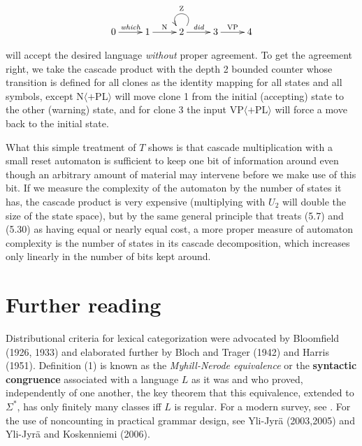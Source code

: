 \begin{equation}
\xymatrix{0\ar[r]^{\textit{which}} & 1\ar[r]^{\text{N}} &
2\ar[r]^{\textit{did}}\ar@(ur,ul)_{\text{Z}} & 3\ar[r]^{\text{VP}}& 4}
\end{equation}

\noindent
will accept the desired language {\it without} proper agreement. To get the
agreement right, we take the cascade product with the depth 2 bounded counter
whose transition is defined for all clones as the identity mapping for all
states and all symbols, except N$\langle +$PL$\rangle$ will move clone 1
from the initial (accepting) state to the other (warning) state, and for clone 
3 the input VP$\langle +$PL$\rangle$ will force a move back to the 
initial state. 

What this simple treatment of $T$ shows is that cascade multiplication with a
small reset automaton is sufficient to keep one bit of information around even
though an arbitrary amount of material may intervene before we make use of
this bit.  If we measure the complexity of the automaton by the number of
states it has, the cascade product is very expensive (multiplying with $U_2$
will double the size of the state space), but by the same general principle
that treats (5.7) and (5.30) as having equal or nearly equal cost, a more
proper measure of automaton complexity is the number of states in its cascade
decomposition, which increases only linearly in the number of bits kept
around.

\section{Further reading}

Distributional criteria for lexical categorization were advocated by
Bloomfield (1926, 1933) \nocite{Bloomfield:1926} \nocite{Bloomfield:1933} and
elaborated further by Bloch and Trager (1942) and Harris (1951). Definition
(1) is known as the {\it Myhill-Nerode equivalence} or the {\bf syntactic
  congruence} associated with a language $L$ as it was 
and  who proved, independently of one another, the key
theorem that this equivalence, extended to $\Sigma^*$, has only finitely many
classes iff $L$ is regular. 
\nocite{Bloch:1942} For a modern survey, see . For the use of
noncounting in practical grammar design, see Yli-Jyr\"{a} (2003,2005) and
Yli-Jyr\"{a} and Koskenniemi (2006).\nocite{Yli-Jyra2:2006}

